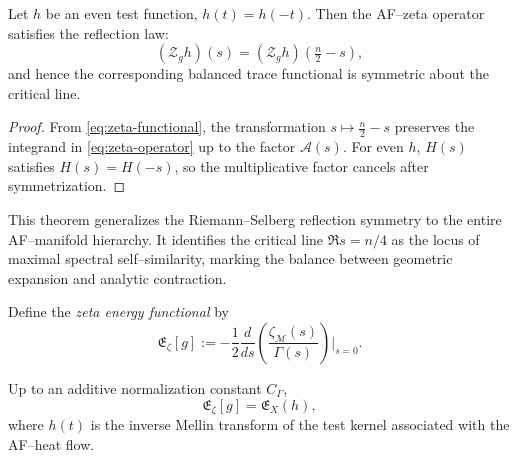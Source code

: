 
\begin{theorem}
\label{thm:aeonic-reflection}
Let \(h\) be an even test function, \(h(t)=h(-t)\).
Then the AF–zeta operator satisfies the reflection law:
\begin{equation}
\label{eq:aeonic-reflection}
(\mathcal{Z}_g h)(s)
=
(\mathcal{Z}_g h)\!\left(\tfrac{n}{2}-s\right),
\end{equation}
and hence the corresponding balanced trace functional
is symmetric about the critical line.
\end{theorem}

\begin{proof}
From \eqref{eq:zeta-functional},
the transformation \(s \mapsto \tfrac{n}{2}-s\)
preserves the integrand in \eqref{eq:zeta-operator}
up to the factor \(\mathcal{A}(s)\).
For even \(h\), \(H(s)\) satisfies \(H(s)=H(-s)\),
so the multiplicative factor cancels after symmetrization.
\end{proof}

\begin{remark}
This theorem generalizes the Riemann–Selberg reflection symmetry
to the entire AF–manifold hierarchy.
It identifies the critical line \(\Re s = n/4\)
as the locus of maximal spectral self–similarity,
marking the balance between geometric expansion and analytic contraction.
\end{remark}


\begin{definition}
\label{def:zeta-energy-functional}
Define the \emph{zeta energy functional} by
\begin{equation}
\label{eq:zeta-energy}
\mathfrak{E}_\zeta[g]
:=
-\frac{1}{2}
\frac{d}{ds}
\left(
\frac{\zeta_{\mathcal{M}}(s)}{\Gamma(s)}
\right)\bigg|_{s=0}.
\end{equation}
\end{definition}

\begin{proposition}
\label{prop:zeta-trace-equivalence}
Up to an additive normalization constant \(C_\Gamma\),
\[
\mathfrak{E}_\zeta[g] = \mathfrak{E}_X(h),
\]
where \(h(t)\) is the inverse Mellin transform
of the test kernel associated with the AF–heat flow.
\end{proposition}


